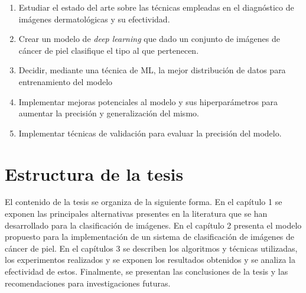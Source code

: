 \begin{enumerate}
    \item Estudiar el estado del arte sobre las técnicas empleadas en el diagnóstico de imágenes dermatológicas y su efectividad.
    \item Crear un modelo de \textit{deep learning} que dado un conjunto de imágenes de cáncer de piel clasifique el tipo al que pertenecen.
    \item Decidir, mediante una técnica de ML, la mejor distribución de datos para entrenamiento del modelo 
    \item Implementar mejoras potenciales al modelo y sus hiperparámetros para aumentar la precisión y generalización del mismo.
    \item Implementar técnicas de validación para evaluar la precisión del modelo.
\end{enumerate}

\section*{Estructura de la tesis}

El contenido de la tesis se organiza de la siguiente forma. En el capítulo 1 se exponen las principales alternativas presentes en la literatura que se han desarrollado para la clasificación de imágenes. En el capítulo 2 presenta el modelo propuesto para la implementación de un sistema de clasificación de imágenes de cáncer de piel. En el capítulos 3 se describen los algoritmos y técnicas utilizadas, los experimentos realizados y se exponen los resultados obtenidos y se analiza la efectividad de estos. Finalmente, se presentan las conclusiones de la tesis y las recomendaciones para investigaciones futuras.